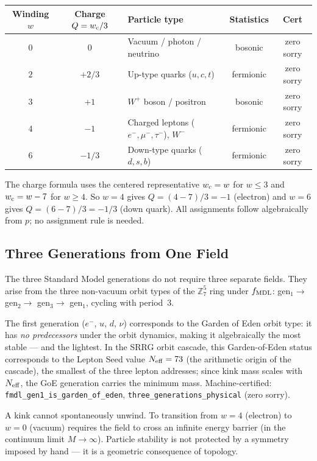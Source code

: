 \documentclass[11pt,a4paper]{article}
\newcommand{\lean}[1]{\texttt{#1}}
\newcommand{\ZS}{\mathbb{Z}_7}
\theoremstyle{definition}
\begin{document}
\begin{center}
\begin{tabular}{@{}cclcc@{}}
\toprule
\textbf{Winding $w$} & \textbf{Charge $Q = w_{\rm c}/3$}
  & \textbf{Particle type} & \textbf{Statistics} & \textbf{Cert} \\
\midrule
$0$ & $0$ & Vacuum / photon / neutrino & bosonic & zero sorry \\
$2$ & $+2/3$ & Up-type quarks ($u,c,t$) & fermionic & zero sorry \\
$3$ & $+1$ & $W^+$ boson / positron & bosonic & zero sorry \\
$4$ & $-1$ & Charged leptons ($e^-,\mu^-,\tau^-$), $W^-$ & fermionic & zero sorry \\
$6$ & $-1/3$ & Down-type quarks ($d,s,b$) & fermionic & zero sorry \\
\bottomrule
\end{tabular}
\end{center}

The charge formula uses the centered representative $w_{\rm c} = w$ for $w \leq 3$
and $w_{\rm c} = w - 7$ for $w \geq 4$.
So $w = 4$ gives $Q = (4-7)/3 = -1$ (electron) and
$w = 6$ gives $Q = (6-7)/3 = -1/3$ (down quark).
All assignments follow algebraically from $p$; no assignment rule is needed.

\subsection{Three Generations from One Field}

The three Standard Model generations do not require three separate fields.
They arise from the three non-vacuum orbit types of the $\ZS^5$ ring under
$f_{\rm MDL}$: gen$_1 \to$ gen$_2 \to$ gen$_3 \to$ gen$_1$, cycling with period~3.

The first generation ($e^-$, $u$, $d$, $\nu$) corresponds to the Garden of Eden
orbit type: it has \emph{no predecessors} under the orbit dynamics, making it
algebraically the most stable --- and the lightest.
In the SRRG orbit cascade, this Garden-of-Eden status corresponds to the Lepton
Seed value $N_{\rm eff} = 73$ (the arithmetic origin of the cascade), the smallest
of the three lepton addresses; since kink mass scales with $N_{\rm eff}$, the GoE
generation carries the minimum mass.
Machine-certified:
\lean{fmdl\_gen1\_is\_garden\_of\_eden}, \lean{three\_generations\_physical} (zero sorry).

\begin{tcolorbox}[colback=boxpurple,colframe=purple!50!black,
  title=Topological protection: why particles are stable]
A kink cannot spontaneously unwind.  To transition from $w=4$ (electron) to
$w=0$ (vacuum) requires the field to cross an infinite energy barrier
(in the continuum limit $M\to\infty$).  Particle stability is not protected
by a symmetry imposed by hand --- it is a geometric consequence of topology.
\end{tcolorbox}
\end{document}
